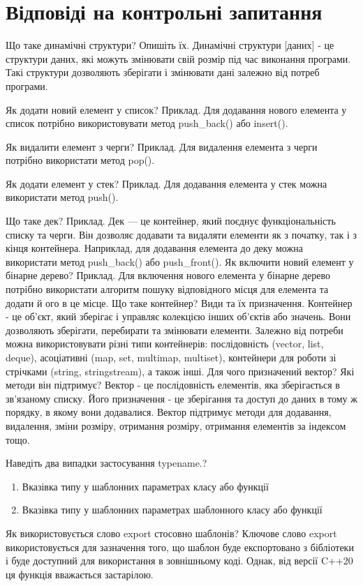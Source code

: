 \documentclass[a4paper, 12pt, oneside]{extarticle}
\begin{document}
\section*{Відповіді на контрольні запитання}
\begin{itemize}
	\question Що таке динамічні структури? Опишіть їх.
		\answer Динамічні структури [даних] - це структури даних, які можуть змінювати свій розмір під час виконання програми. Такі структури дозволяють зберігати і змінювати дані залежно від потреб програми.

	\question Як додати новий елемент у список? Приклад.
	\answer Для додавання нового елемента у список потрібно використовувати метод push_back() або insert().

	\question Як видалити елемент з черги? Приклад.
	\answer Для видалення елемента з черги потрібно використати метод pop().

	\question Як додати елемент у стек? Приклад.
	\answer Для додавання елемента у стек можна використати метод push().

	\question Що таке дек? Приклад.
	\answer Дек --- це контейнер, який поєднує функціональність списку та черги. Він дозволяє додавати та видаляти елементи як з початку, так і з кінця контейнера. Наприклад, для додавання елемента до деку можна використати метод push_back() або push_front().
	\question Як включити новий елемент у бінарне дерево? Приклад.
	\answer Для включення нового елемента у бінарне дерево потрібно використати алгоритм пошуку відповідного місця для елемента та додати й
ого в це місце.
	\question Що таке контейнер? Види та їх призначення.
	\answer Контейнер - це об'єкт, який зберігає і управляє колекцією інших об'єктів або значень. Вони дозволяють зберігати, перебирати та змінювати елементи. Залежно від потреби можна використовувати різні типи контейнерів: послідовність (vector, list, deque), асоціативні (map, set, multimap, multiset), контейнери для роботи зі стрічками (string, stringstream), а також інші.
	\question Для чого призначений вектор? Які методи він підтримує?
	\answer Вектор - це послідовність елементів, яка зберігається в зв'язаному списку. Його призначення - це зберігання та доступ до даних в тому ж порядку, в якому вони додавалися. Вектор підтримує методи для додавання, видалення, зміни розміру, отримання розміру, отримання елементів за індексом тощо.

	\question Наведіть два випадки застосування typename.?
	\answer
		\begin{enumerate}
			\item	    Вказівка типу у шаблонних параметрах класу або функції
			\item	Вказівка типу у шаблонних параметрах шаблонного класу або функції
		\end{enumerate}
	\question Як використовується слово export стосовно шаблонів?
	\answer Ключове слово export використовується для зазначення того, що шаблон буде експортовано з бібліотеки і буде доступний для використання в зовнішньому коді. Однак, від версії C++20 ця функція вважається застарілою.


\end{itemize}
\end{document}
